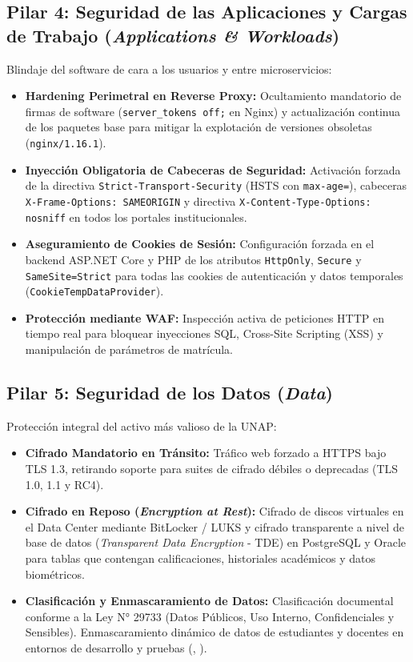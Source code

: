 \subsection*{Pilar 4: Seguridad de las Aplicaciones y Cargas de Trabajo (\textit{Applications \& Workloads})}
Blindaje del software de cara a los usuarios y entre microservicios:
\begin{itemize}
    \item \textbf{Hardening Perimetral en Reverse Proxy:} Ocultamiento mandatorio de firmas de software (\texttt{server\_tokens off;} en Nginx) y actualización continua de los paquetes base para mitigar la explotación de versiones obsoletas (\texttt{nginx/1.16.1}).
    \item \textbf{Inyección Obligatoria de Cabeceras de Seguridad:} Activación forzada de la directiva \texttt{Strict-\allowbreak Transport-\allowbreak Security} (HSTS con \texttt{max-age=}), cabeceras \texttt{X-Frame-\allowbreak Options: SAMEORIGIN} y directiva \texttt{X-Content-\allowbreak Type-\allowbreak Options: nosniff} en todos los portales institucionales.
    \item \textbf{Aseguramiento de Cookies de Sesión:} Configuración forzada en el backend ASP.NET Core y PHP de los atributos \texttt{HttpOnly}, \texttt{Secure} y \texttt{SameSite=Strict} para todas las cookies de autenticación y datos temporales (\texttt{CookieTempDataProvider}).
    \item \textbf{Protección mediante WAF:} Inspección activa de peticiones HTTP en tiempo real para bloquear inyecciones SQL, Cross-Site Scripting (XSS) y manipulación de parámetros de matrícula.
\end{itemize}

\subsection*{Pilar 5: Seguridad de los Datos (\textit{Data})}
Protección integral del activo más valioso de la UNAP:
\begin{itemize}
    \item \textbf{Cifrado Mandatorio en Tránsito:} Tráfico web forzado a HTTPS bajo TLS 1.3, retirando soporte para suites de cifrado débiles o deprecadas (TLS 1.0, 1.1 y RC4).
    \item \textbf{Cifrado en Reposo (\textit{Encryption at Rest}):} Cifrado de discos virtuales en el Data Center mediante BitLocker / LUKS y cifrado transparente a nivel de base de datos (\textit{Transparent Data Encryption} - TDE) en PostgreSQL y Oracle para tablas que contengan calificaciones, historiales académicos y datos biométricos.
    \item \textbf{Clasificación y Enmascaramiento de Datos:} Clasificación documental conforme a la Ley N° 29733 (Datos Públicos, Uso Interno, Confidenciales y Sensibles). Enmascaramiento dinámico de datos de estudiantes y docentes en entornos de desarrollo y pruebas (, ).
\end{itemize}

